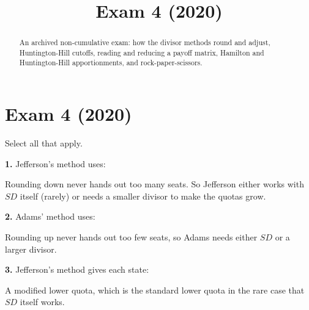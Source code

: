 \documentclass[12pt]{ximera}
\title{Exam 4 (2020)}
\begin{document}
\begin{abstract}
An archived non-cumulative exam: how the divisor methods round and adjust, Huntington-Hill cutoffs, reading and reducing a payoff matrix, Hamilton and Huntington-Hill apportionments, and rock-paper-scissors.
\end{abstract}
\maketitle

\section*{Exam 4 (2020)}

\begin{problem}
Select all that apply.

\begin{prompt}
\textbf{1.} Jefferson's method uses:
\begin{selectAll}
\end{selectAll}
\begin{feedback}
Rounding down never hands out too many seats. So Jefferson either works with $SD$
itself (rarely) or needs a smaller divisor to make the quotas grow.
\end{feedback}
\end{prompt}

\begin{prompt}
\textbf{2.} Adams' method uses:
\begin{selectAll}
\end{selectAll}
\begin{feedback}
Rounding up never hands out too few seats, so Adams needs either $SD$ or a larger
divisor.
\end{feedback}
\end{prompt}

\begin{prompt}
\textbf{3.} Jefferson's method gives each state:
\begin{selectAll}
\end{selectAll}
\begin{feedback}
A modified lower quota, which is the standard lower quota in the rare case that $SD$
itself works.
\end{feedback}
\end{prompt}


\end{problem}
\end{document}
